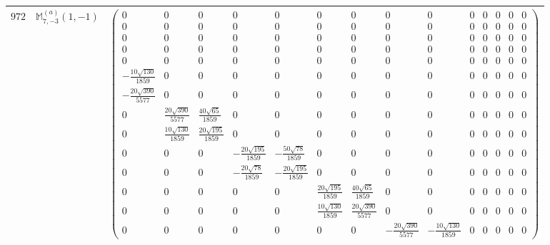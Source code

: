 \documentclass[fleqn,8pt,landscape]{jsarticle}
\begin{document}
\begin{center}
\begin{longtable}{ccc}
$ 972 $ & $ \mathbb{M}_{7,-3}^{(a)}(1,-1) $ & $ \begin{pmatrix} 0 & 0 & 0 & 0 & 0 & 0 & 0 & 0 & 0 & 0 & 0 & 0 & 0 & 0 \\ 0 & 0 & 0 & 0 & 0 & 0 & 0 & 0 & 0 & 0 & 0 & 0 & 0 & 0 \\ 0 & 0 & 0 & 0 & 0 & 0 & 0 & 0 & 0 & 0 & 0 & 0 & 0 & 0 \\ 0 & 0 & 0 & 0 & 0 & 0 & 0 & 0 & 0 & 0 & 0 & 0 & 0 & 0 \\ 0 & 0 & 0 & 0 & 0 & 0 & 0 & 0 & 0 & 0 & 0 & 0 & 0 & 0 \\ - \frac{10 \sqrt{130}}{1859} & 0 & 0 & 0 & 0 & 0 & 0 & 0 & 0 & 0 & 0 & 0 & 0 & 0 \\ - \frac{20 \sqrt{390}}{5577} & 0 & 0 & 0 & 0 & 0 & 0 & 0 & 0 & 0 & 0 & 0 & 0 & 0 \\ 0 & \frac{20 \sqrt{390}}{5577} & \frac{40 \sqrt{65}}{1859} & 0 & 0 & 0 & 0 & 0 & 0 & 0 & 0 & 0 & 0 & 0 \\ 0 & \frac{10 \sqrt{130}}{1859} & \frac{20 \sqrt{195}}{1859} & 0 & 0 & 0 & 0 & 0 & 0 & 0 & 0 & 0 & 0 & 0 \\ 0 & 0 & 0 & - \frac{20 \sqrt{195}}{1859} & - \frac{50 \sqrt{78}}{1859} & 0 & 0 & 0 & 0 & 0 & 0 & 0 & 0 & 0 \\ 0 & 0 & 0 & - \frac{20 \sqrt{78}}{1859} & - \frac{20 \sqrt{195}}{1859} & 0 & 0 & 0 & 0 & 0 & 0 & 0 & 0 & 0 \\ 0 & 0 & 0 & 0 & 0 & \frac{20 \sqrt{195}}{1859} & \frac{40 \sqrt{65}}{1859} & 0 & 0 & 0 & 0 & 0 & 0 & 0 \\ 0 & 0 & 0 & 0 & 0 & \frac{10 \sqrt{130}}{1859} & \frac{20 \sqrt{390}}{5577} & 0 & 0 & 0 & 0 & 0 & 0 & 0 \\ 0 & 0 & 0 & 0 & 0 & 0 & 0 & - \frac{20 \sqrt{390}}{5577} & - \frac{10 \sqrt{130}}{1859} & 0 & 0 & 0 & 0 & 0 \end{pmatrix} $ \\ \hline

\end{longtable}
\end{center}
\end{document}
